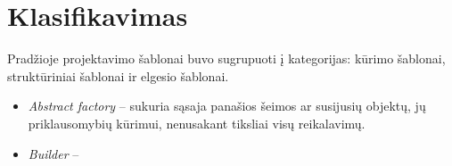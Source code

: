 \documentclass[10pt]{IEEEtran}
\begin{document}
	\section{Klasifikavimas}

		Pradžioje projektavimo šablonai buvo sugrupuoti į kategorijas: kūrimo šablonai, struktūriniai šablonai ir elgesio šablonai. 

		\begin{itemize}
			\item \textit{Abstract factory} -- sukuria sąsaja panašios šeimos ar susijusių objektų, jų priklausomybių kūrimui, nenusakant tiksliai visų reikalavimų.
			\item \textit{Builder} -- 
		\end{itemize}

		
\end{document}
